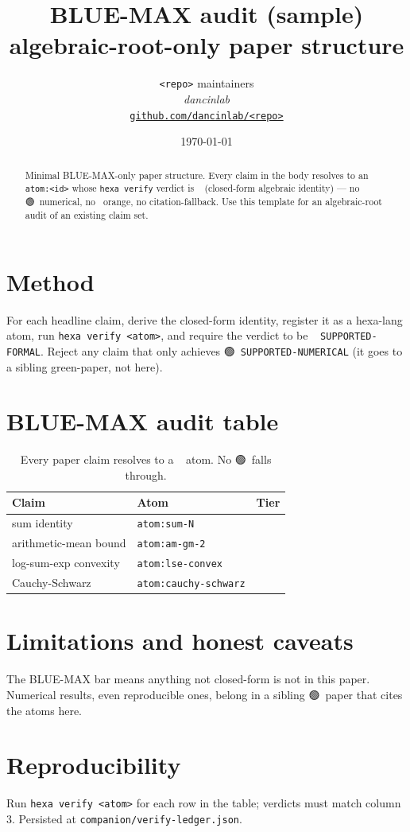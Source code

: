 \documentclass[11pt,a4paper]{article}
\title{\textbf{BLUE-MAX audit (sample)}\\[2pt]\large algebraic-root-only paper structure}
\author{\texttt{<repo>} maintainers\\\normalsize\textit{dancinlab}\\[2pt]\normalsize\href{https://github.com/dancinlab/<repo>}{\texttt{github.com/dancinlab/<repo>}}}
\date{\today}
\providecommand{\tierBlue}{🔵}
\providecommand{\tierGreen}{🟢}
\begin{document}
\maketitle

\begin{abstract}
Minimal BLUE-MAX-only paper structure. Every claim in the body resolves to an \texttt{atom:<id>} whose \texttt{hexa verify} verdict is \tierBlue\ (closed-form algebraic identity) — no \tierGreen\ numerical, no \tierOrange\ orange, no citation-fallback. Use this template for an algebraic-root audit of an existing claim set.
\end{abstract}

\section{Method}
For each headline claim, derive the closed-form identity, register it as a hexa-lang atom, run \texttt{hexa verify <atom>}, and require the verdict to be \tierBlue\ \texttt{SUPPORTED-FORMAL}. Reject any claim that only achieves \tierGreen\ \texttt{SUPPORTED-NUMERICAL} (it goes to a sibling green-paper, not here).

\section{BLUE-MAX audit table}
\begin{table}[h]\centering\small
\begin{tabular}{@{}lll@{}}\toprule
\textbf{Claim} & \textbf{Atom} & \textbf{Tier} \\\midrule
sum identity            & \texttt{atom:sum-N}           & \tierBlue \\
arithmetic-mean bound   & \texttt{atom:am-gm-2}         & \tierBlue \\
log-sum-exp convexity   & \texttt{atom:lse-convex}      & \tierBlue \\
Cauchy-Schwarz          & \texttt{atom:cauchy-schwarz}  & \tierBlue \\
\bottomrule\end{tabular}
\caption{Every paper claim resolves to a \tierBlue\ atom. No \tierGreen\ falls through.}
\end{table}

\section{Limitations and honest caveats}
The BLUE-MAX bar means anything not closed-form is not in this paper. Numerical results, even reproducible ones, belong in a sibling \tierGreen\ paper that cites the atoms here.

\section{Reproducibility}
Run \texttt{hexa verify <atom>} for each row in the table; verdicts must match column 3. Persisted at \texttt{companion/verify-ledger.json}.
\end{document}
